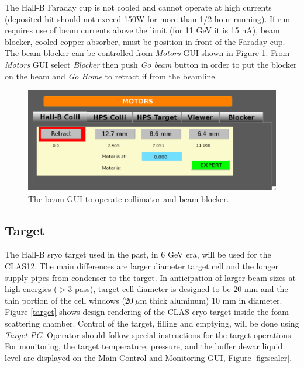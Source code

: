 \documentclass[12pt]{article}
\begin{document}
The Hall-B Faraday cup is not cooled and cannot operate at high currents (deposited hit should not exceed 150W for more than 1/2 hour running). If run requires use of beam currents above the limit (for 11 GeV it is 15 nA), beam blocker, cooled-copper absorber, must be position in front of the Faraday cup. The beam blocker can be controlled from {\it Motors} GUI shown in Figure \ref{fig:beamblocker}.  From {\it Motors} GUI select {\it Blocker} then push {\it Go beam} button  in order to put the blocker on the beam and {\it Go Home} to retract if from the beamline. 

\begin{figure}[tbhp]
{\centering \includegraphics[scale=0.65]{collimator.pdf} \par}
\caption{The beam GUI to operate collimator and beam blocker. \label{fig:beamblocker}}
\end{figure}


\clearpage

\subsection{\bf Target}
\indent

The Hall-B sryo target used in the past, in $6$ GeV era, will be used for the CLAS12. The main differences are larger diameter target cell and the longer supply pipes from condenser to the target. In anticipation of larger beam sizes at high energies ($> 3$ pass), target cell diameter is designed to be $20$ mm and the thin portion of the cell windows ($20~\mu$m thick aluminum) $10$ mm in diameter. Figure \ref{target} shows design rendering of the CLAS cryo target inside the foam scattering chamber. Control of the target, filling and emptying, will be done using {\it Target PC}. Operator should follow special instructions for the target operations. For monitoring, the target temperature, pressure, and the buffer dewar liquid level are displayed on the Main Control and Monitoring GUI, Figure \ref{fig:scaler}. 
\end{document}
